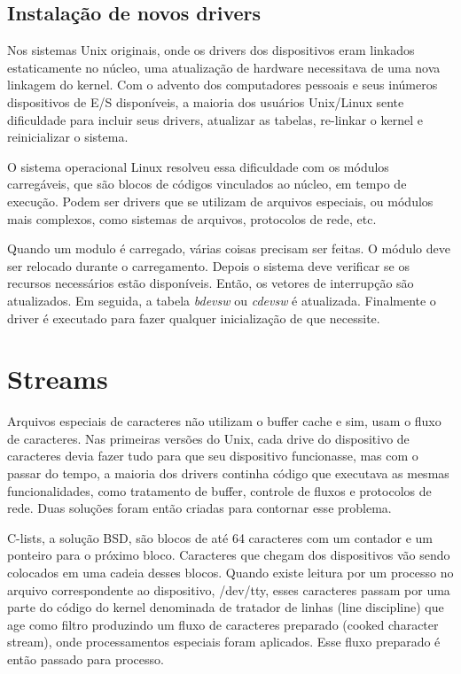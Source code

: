 \subsection{Instalação de novos drivers}

Nos sistemas Unix originais, onde os drivers dos dispositivos eram linkados estaticamente no núcleo, uma atualização de hardware necessitava de uma nova linkagem do kernel. Com o advento dos computadores pessoais e seus inúmeros dispositivos de E/S disponíveis, a maioria dos usuários Unix/Linux sente dificuldade para incluir seus drivers, atualizar as tabelas, re-linkar o kernel e reinicializar o sistema.

O sistema operacional Linux resolveu essa dificuldade com os módulos carregáveis, que são blocos de códigos vinculados ao núcleo, em tempo de execução. Podem ser drivers que se utilizam de arquivos especiais, ou módulos mais complexos, como sistemas de arquivos, protocolos de rede, etc.

Quando um modulo é carregado, várias coisas precisam ser feitas. O módulo deve ser relocado durante o carregamento. Depois o sistema deve verificar se os recursos necessários estão disponíveis. Então, os vetores de interrupção são atualizados. Em seguida, a tabela \emph{bdevsw} ou \emph{cdevsw} é atualizada. Finalmente o driver é executado para fazer qualquer inicialização de que necessite.

\section{Streams}

Arquivos especiais de caracteres não utilizam o buffer cache e sim, usam o fluxo de caracteres. Nas primeiras versões do Unix, cada drive do dispositivo de caracteres devia fazer tudo para que seu dispositivo funcionasse, mas com o passar do tempo, a maioria dos drivers continha código que executava as mesmas funcionalidades, como tratamento de buffer, controle de fluxos e protocolos de rede. Duas soluções foram então criadas para contornar esse problema.

C-lists, a solução BSD, são blocos de até 64 caracteres com um contador e um ponteiro para o próximo bloco. Caracteres que chegam dos dispositivos vão sendo colocados em uma cadeia desses blocos. Quando existe leitura por um processo no arquivo correspondente ao dispositivo, /dev/tty, esses caracteres passam por uma parte do código do kernel denominada de tratador de linhas (line discipline) que age como filtro produzindo um fluxo de caracteres preparado (cooked character stream), onde processamentos especiais foram aplicados. Esse fluxo preparado é então passado para processo.

